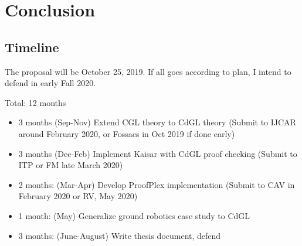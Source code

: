 \documentclass[12pt]{cmuthesis}
\theoremstyle{definition}
\theoremstyle{remark}
\newcommand{\CGL}{\textsf{CGL}\xspace}
\newcommand{\CdGL}{\textsf{CdGL}\xspace}
\newcommand{\ProofPlex}{ProofPlex\xspace}
\begin{document}
\chapter{Conclusion}
\section{Timeline}
The proposal will be October 25, 2019.
If all goes according to plan, I intend to defend in early Fall 2020.

Total: 12 months
\begin{itemize}
\item 3 months (Sep-Nov) Extend \CGL theory to \CdGL theory (Submit to IJCAR around February 2020, or Fossacs in Oct 2019 if done early)
\item 3 months (Dec-Feb) Implement Kaisar with \CdGL proof checking (Submit to ITP or FM late March 2020)
\item 2 months: (Mar-Apr) Develop \ProofPlex implementation (Submit to CAV in February 2020 or RV, May 2020) 
\item 1 month: (May) Generalize ground robotics case study to \CdGL
\item 3 months: (June-August) Write thesis document, defend
\end{itemize}

\appendix


\backmatter


\end{document}

